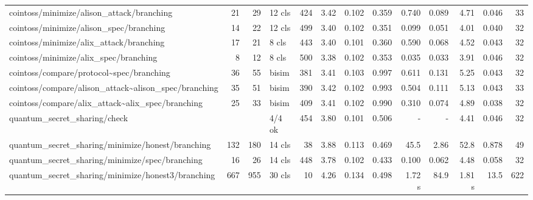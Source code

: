 \begin{tabular}{lrrlrrrrrrrrr}
	cointoss/minimize/alison\_attack/branching                                          & 21     & 29      & 12 cls    & 424  & 3.42  & 0.102 & 0.359     & 0.740   & 0.089   & 4.71    & 0.046 & 33      \\
	cointoss/minimize/alison\_spec/branching                                            & 14     & 22      & 12 cls    & 499  & 3.40  & 0.102 & 0.351     & 0.099   & 0.051   & 4.01    & 0.040 & 32      \\
	cointoss/minimize/alix\_attack/branching                                            & 17     & 21      & 8 cls     & 443  & 3.40  & 0.101 & 0.360     & 0.590   & 0.068   & 4.52    & 0.043 & 32      \\
	cointoss/minimize/alix\_spec/branching                                              & 8      & 12      & 8 cls     & 500  & 3.38  & 0.102 & 0.353     & 0.035   & 0.033   & 3.91    & 0.046 & 32      \\
	cointoss/compare/protocol\textasciitilde{}spec/branching                            & 36     & 55      & bisim     & 381  & 3.41  & 0.103 & 0.997     & 0.611   & 0.131   & 5.25    & 0.043 & 32      \\
	cointoss/compare/alison\_attack\textasciitilde{}alison\_spec/branching              & 35     & 51      & bisim     & 390  & 3.42  & 0.102 & 0.993     & 0.504   & 0.111   & 5.13    & 0.043 & 33      \\
	cointoss/compare/alix\_attack\textasciitilde{}alix\_spec/branching                  & 25     & 33      & bisim     & 409  & 3.41  & 0.102 & 0.990     & 0.310   & 0.074   & 4.89    & 0.038 & 32      \\
	quantum\_secret\_sharing/check                                                      &        &         & 4/4 ok    & 454  & 3.80  & 0.101 & 0.506     & -       & -       & 4.41    & 0.046 & 32      \\
	quantum\_secret\_sharing/minimize/honest/branching                                  & 132    & 180     & 14 cls    & 38   & 3.88  & 0.113 & 0.469     & 45.5    & 2.86    & 52.8    & 0.878 & 49      \\
	quantum\_secret\_sharing/minimize/spec/branching                                    & 16     & 26      & 14 cls    & 448  & 3.78  & 0.102 & 0.433     & 0.100   & 0.062   & 4.48    & 0.058 & 32      \\
	quantum\_secret\_sharing/minimize/honest3/branching                                 & 667    & 955     & 30 cls    & 10   & 4.26  & 0.134 & 0.498     & 1.72 s  & 84.9    & 1.81 s  & 13.5  & 622     \\

\end{tabular}

